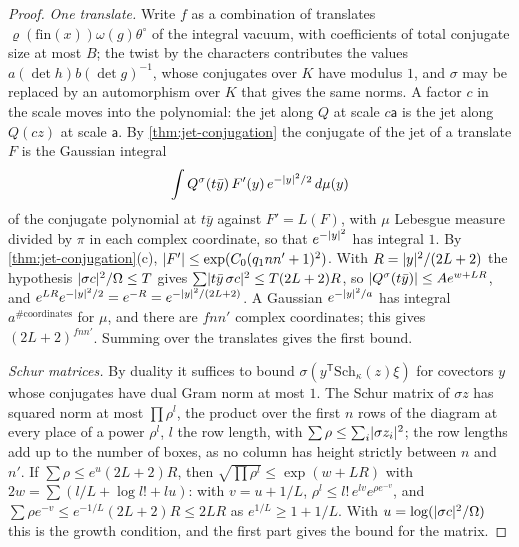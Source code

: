 \begin{proof}
\emph{One translate.} Write $f$ as a combination of translates $\varrho(\mathrm{fin}(x))\omega(g)\theta^\circ$ of the integral vacuum, with coefficients of total conjugate size at most $B$; the twist by the characters contributes the values $a(\det h)b(\det g)^{-1}$, whose conjugates over $K$ have modulus $1$, and $\sigma$ may be replaced by an
automorphism over $K$ that gives the same norms. A factor $c$ in the scale moves into the polynomial: the jet along $Q$ at scale $c\mathsf a$ is the jet along $Q(cz)$ at scale $\mathsf a$. By \cref{thm:jet-conjugation} the conjugate of the jet of a translate $F$ is the Gaussian integral
\[
  \int Q^\sigma(t\bar y)\,F'(y)\,e^{-\lvert y\rvert^2/2}\,d\mu(y)
\]
of the conjugate polynomial at $t\bar y$ against $F'=L(F)$, with $\mu$ Lebesgue measure divided by $\pi$ in each complex coordinate, so that $e^{-\lvert y\rvert^2}$ has integral $1$. By \cref{thm:jet-conjugation}(c), $\lvert F'\rvert\le\exp(C_0(q_1nn'+1)^2)$. With $R=\lvert y\rvert^2/(2L+2)$ the hypothesis $\lvert \sigma c\rvert^2/\Omega\le T$ gives
$\sum\lvert t\bar y\,\sigma c\rvert^2\le T(2L+2)R$, so $\lvert Q^\sigma(t\bar y)\rvert\le Ae^{w+LR}$, and $e^{LR}e^{-\lvert y\rvert^2/2}=e^{-R}=e^{-\lvert y\rvert^2/(2L+2)}$. A Gaussian $e^{-\lvert y\rvert^2/a}$ has integral $a^{\#\text{coordinates}}$ for $\mu$, and there are $fnn'$ complex coordinates; this gives $(2L+2)^{fnn'}$. Summing over the translates
gives the first bound.

\emph{Schur matrices.} By duality it suffices to bound $\sigma(y^{\mathsf T}\mathrm{Sch}_\kappa(z)\xi)$ for covectors $y$ whose conjugates have dual Gram norm at most $1$. The Schur matrix of $\sigma z$ has squared norm at most $\prod\rho^l$, the product over the first $n$ rows of the diagram at every place of a power $\rho^l$, $l$ the row length,
with $\sum\rho\le\sum_i\lvert \sigma z_i\rvert^2$; the row lengths add up to the number of boxes, as no column has height strictly between $n$ and $n'$. If $\sum\rho\le e^u(2L+2)R$, then $\sqrt{\prod\rho^l}\le\exp(w+LR)$ with $2w=\sum(l/L+\log l!+lu)$: with $v=u+1/L$, $\rho^l\le l!\,e^{lv}e^{\rho e^{-v}}$, and
$\sum\rho e^{-v}\le e^{-1/L}(2L+2)R\le2LR$ as $e^{1/L}\ge1+1/L$. With $u=\log(\lvert \sigma c\rvert^2/\Omega)$ this is the growth condition, and the first part gives the bound for the matrix.
\end{proof}

